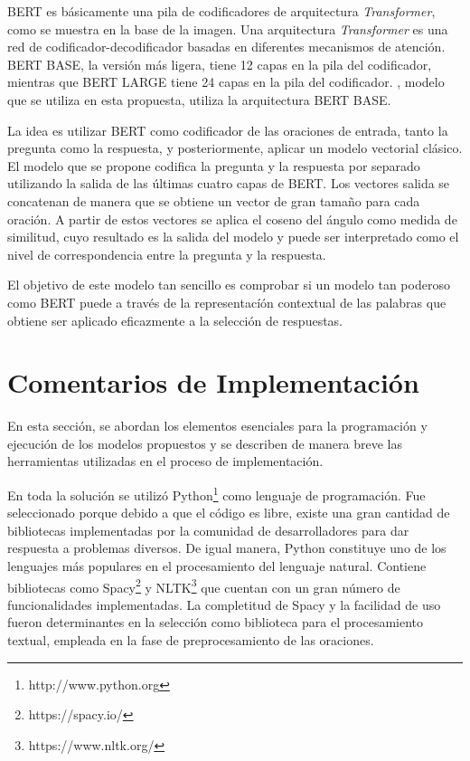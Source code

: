 BERT es básicamente una pila de codificadores de arquitectura \textit{Transformer}, como se muestra en la base de la imagen. Una arquitectura \textit{Transformer} es una red de codificador-decodificador basadas en diferentes mecanismos de atención. BERT BASE, la versión más ligera, tiene 12 capas en la pila del codificador, mientras que BERT LARGE tiene 24 capas en la pila del codificador. \cite{2020-spanish-bert}, modelo que se utiliza en esta propuesta, utiliza la arquitectura BERT BASE.

La idea es utilizar BERT como codificador de las oraciones de entrada, tanto la pregunta como la respuesta, y posteriormente, aplicar un modelo vectorial clásico. El modelo que se propone codifica la pregunta y la respuesta por separado utilizando la salida de las últimas cuatro capas de BERT. Los vectores salida se concatenan de manera que se obtiene un vector de gran tamaño para cada oración. A partir de estos vectores se aplica el coseno del ángulo como medida de similitud, cuyo resultado es la salida del modelo y puede ser interpretado como el nivel de correspondencia entre la pregunta y la respuesta.

El objetivo de este modelo tan sencillo es comprobar si un modelo tan poderoso como BERT puede a través de la representacíón contextual de las palabras que obtiene ser aplicado eficazmente a la selección de respuestas.

\section{Comentarios de Implementación}\label{section:implementation}

En esta sección, se abordan los elementos esenciales para la programación y ejecución de los modelos propuestos y se describen de manera breve las herramientas utilizadas en el proceso de implementación.

En toda la solución se utilizó Python\footnote{http://www.python.org} como lenguaje de programación. Fue seleccionado porque debido a que el código es libre, existe una gran cantidad de bibliotecas implementadas por la comunidad de desarrolladores para dar respuesta a problemas diversos. De igual manera, Python constituye uno de los lenguajes más populares en el procesamiento del lenguaje natural. Contiene bibliotecas como Spacy\footnote{https://spacy.io/} y NLTK\footnote{https://www.nltk.org/} que cuentan con un gran número de funcionalidades implementadas. La completitud de Spacy y la facilidad de uso fueron determinantes en la selección como biblioteca para el procesamiento textual, empleada en la fase de preprocesamiento de las oraciones. 

